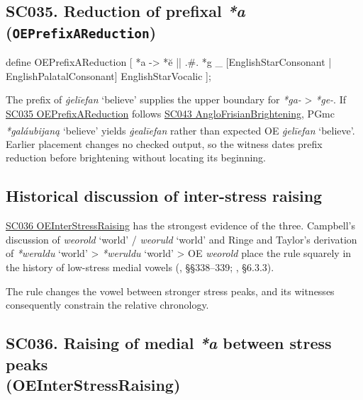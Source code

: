 \documentclass[
  british,
  a4paper,
  openany]{book}
\providecommand{\Pred}[1]{\textsuperscript{\dag}\emph{#1}}
\providecommand{\Recon}[1]{\emph{*#1}}
{\catcode`→=\active \global\def→{\ensuremath{\rightarrow}}}
\providecommand{\texorpdfstring}[2]{#1}
\DeclareRobustCommand{\CAPRRuleHeading}[2]{%
  #1\texorpdfstring{\\(#2)}{ (#2)}%
}
\providecommand{\Pred}[1]{\textsuperscript{\dag}\emph{#1}}
\providecommand{\Recon}[1]{\emph{*#1}}
{\catcode`→=\active \global\def→{\ensuremath{\rightarrow}}}
\begin{document}
\subsection{\texorpdfstring{SC035. Reduction of prefixal \emph{*a}
(\texttt{OEPrefixAReduction})}{SC035. Reduction of prefixal  (OEPrefixAReduction)}}\label{rule-OEPrefixAReduction}

\begin{ReaderFacingFoma}
define OEPrefixAReduction [
    {*a} -> {*ĕ}
        || .#. {*g} _
           [EnglishStarConsonant | EnglishPalatalConsonant]
           EnglishStarVocalic
];
\end{ReaderFacingFoma}

The prefix of \emph{ġelīefan} `believe' supplies the upper boundary for
\emph{*ga-} \textgreater{} \emph{*ge-}. If
\hyperref[rule-OEPrefixAReduction]{SC035 OEPrefixAReduction} follows
\hyperref[rule-AngloFrisianBrightening]{SC043 AngloFrisianBrightening},
PGmc \Recon{galáubijaną} `believe' yields \Pred{ġealīefan} rather than
expected OE \emph{ġelīefan} `believe'. Earlier placement changes no
checked output, so the witness dates prefix reduction before brightening
without locating its beginning.

\subsection{Historical discussion of inter-stress
raising}\label{historical-discussion-of-inter-stress-raising}

\hyperref[rule-OEInterStressRaising]{SC036 OEInterStressRaising} has the
strongest evidence of the three. Campbell's discussion of \emph{weorold}
`world' / \emph{weoruld} `world' and Ringe and Taylor's derivation of
\Recon{weraldu} `world' \textgreater{} \Recon{weruldu} `world'
\textgreater{} OE \emph{weorold} place the rule squarely in the history
of low-stress medial vowels (, §§338--339; , §6.3.3).

The rule changes the vowel between stronger stress peaks, and its
witnesses consequently constrain the relative chronology.

\subsection{\texorpdfstring{\CAPRRuleHeading{SC036. Raising of medial \emph{*a} between stress peaks}{OEInterStressRaising}}{}}\label{rule-OEInterStressRaising}
\end{document}
